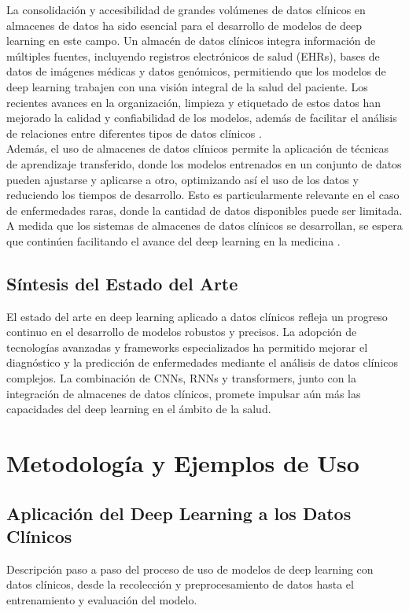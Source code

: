 \documentclass{article}
\begin{document}
La consolidación y accesibilidad de grandes volúmenes de datos clínicos en almacenes de datos ha sido esencial para el desarrollo de modelos de deep learning en este campo. Un almacén de datos clínicos integra información de múltiples fuentes, incluyendo registros electrónicos de salud (EHRs), bases de datos de imágenes médicas y datos genómicos, permitiendo que los modelos de deep learning trabajen con una visión integral de la salud del paciente. Los recientes avances en la organización, limpieza y etiquetado de estos datos han mejorado la calidad y confiabilidad de los modelos, además de facilitar el análisis de relaciones entre diferentes tipos de datos clínicos \cite{miotto2018deep}.
\\

Además, el uso de almacenes de datos clínicos permite la aplicación de técnicas de aprendizaje transferido, donde los modelos entrenados en un conjunto de datos pueden ajustarse y aplicarse a otro, optimizando así el uso de los datos y reduciendo los tiempos de desarrollo. Esto es particularmente relevante en el caso de enfermedades raras, donde la cantidad de datos disponibles puede ser limitada. A medida que los sistemas de almacenes de datos clínicos se desarrollan, se espera que continúen facilitando el avance del deep learning en la medicina \cite{shickel2017deep}.

\subsection{Síntesis del Estado del Arte}

El estado del arte en deep learning aplicado a datos clínicos refleja un progreso continuo en el desarrollo de modelos robustos y precisos. La adopción de tecnologías avanzadas y frameworks especializados ha permitido mejorar el diagnóstico y la predicción de enfermedades mediante el análisis de datos clínicos complejos. La combinación de CNNs, RNNs y transformers, junto con la integración de almacenes de datos clínicos, promete impulsar aún más las capacidades del deep learning en el ámbito de la salud.
\\

\section{Metodología y Ejemplos de Uso}
\label{sec:metodologia_ejemplos}
\subsection{Aplicación del Deep Learning a los Datos Clínicos}
Descripción paso a paso del proceso de uso de modelos de deep learning con datos clínicos, desde la recolección y preprocesamiento de datos hasta el entrenamiento y evaluación del modelo.
\end{document}
